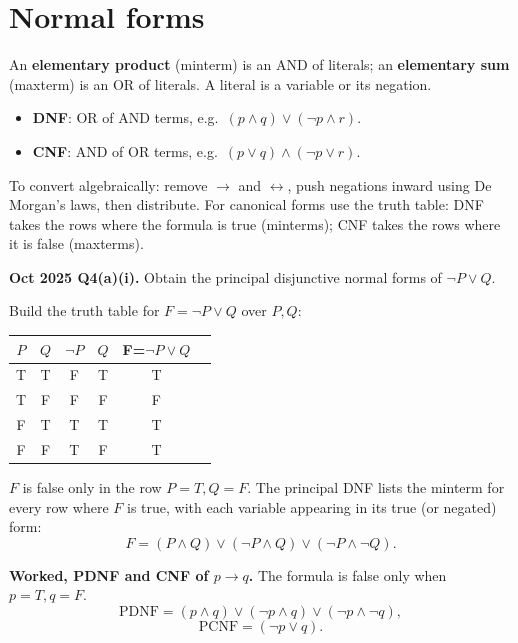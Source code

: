 \documentclass[11pt,a4paper]{article}
\begin{document}
\section{Normal forms}

An \textbf{elementary product} (minterm) is an AND of literals; an \textbf{elementary sum} (maxterm) is an OR of literals. A literal is a variable or its negation.

\begin{itemize}
\item \textbf{DNF}: OR of AND terms, e.g.\ $(p\land q)\lor(\neg p\land r)$.
\item \textbf{CNF}: AND of OR terms, e.g.\ $(p\lor q)\land(\neg p\lor r)$.
\end{itemize}

To convert algebraically: remove $\to$ and $\leftrightarrow$, push negations inward using De Morgan's laws, then distribute. For canonical forms use the truth table: DNF takes the rows where the formula is true (minterms); CNF takes the rows where it is false (maxterms).

\begin{pyqbox}
\textbf{Oct 2025 Q4(a)(i).} Obtain the principal disjunctive normal forms of $\neg P\lor Q$.
\end{pyqbox}

\begin{solbox}
Build the truth table for $F=\neg P\lor Q$ over $P,Q$:

\begin{center}\small
\begin{tabular}{cc|cccc}
\toprule $P$&$Q$&$\neg P$&$Q$&F=$\neg P\lor Q$\\\midrule
T&T&F&T&T\\
T&F&F&F&F\\
F&T&T&T&T\\
F&F&T&F&T\\\bottomrule
\end{tabular}
\end{center}

$F$ is false only in the row $P=T,Q=F$. The principal DNF lists the minterm for every row where $F$ is true, with each variable appearing in its true (or negated) form:
\[
F=(P\land Q)\lor(\neg P\land Q)\lor(\neg P\land\neg Q).
\]
\end{solbox}

\begin{exambox}
\textbf{Worked, PDNF and CNF of $p\to q$.} The formula is false only when $p=T,q=F$.
\[
\text{PDNF}=(p\land q)\lor(\neg p\land q)\lor(\neg p\land\neg q),
\]
\[
\text{PCNF}=(\neg p\lor q).
\]
\end{exambox}
\end{document}
